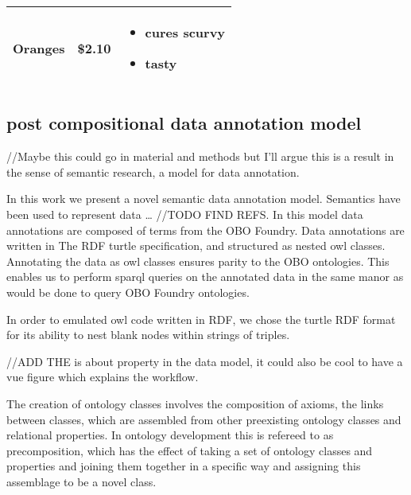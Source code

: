 \documentclass[]{article}
\providecommand{\tightlist}{%
  \setlength{\itemsep}{0pt}\setlength{\parskip}{0pt}}
\begin{document}
\begin{longtable}[]{@{}lll@{}}
\begin{minipage}[t]{0.32\columnwidth}\raggedright
Oranges\strut
\end{minipage} & \begin{minipage}[t]{0.32\columnwidth}\raggedright
\$2.10\strut
\end{minipage} & \begin{minipage}[t]{0.32\columnwidth}\raggedright
\begin{itemize}
\tightlist
\item
  cures scurvy
\item
  tasty
\end{itemize}\strut
\end{minipage}\tabularnewline
\bottomrule
\end{longtable}

\hypertarget{post-compositional-data-annotation-model}{%
\subsection{post compositional data annotation
model}\label{post-compositional-data-annotation-model}}

//Maybe this could go in material and methods but I'll argue this is a
result in the sense of semantic research, a model for data annotation.

In this work we present a novel semantic data annotation model.
Semantics have been used to represent data \ldots{} //TODO FIND REFS. In
this model data annotations are composed of terms from the OBO Foundry.
Data annotations are written in The RDF turtle specification, and
structured as nested owl classes. Annotating the data as owl classes
ensures parity to the OBO ontologies. This enables us to perform sparql
queries on the annotated data in the same manor as would be done to
query OBO Foundry ontologies.

In order to emulated owl code written in RDF, we chose the turtle RDF
format for its ability to nest blank nodes within strings of triples.

//ADD THE is about property in the data model, it could also be cool to
have a vue figure which explains the workflow.

The creation of ontology classes involves the composition of axioms, the
links between classes, which are assembled from other preexisting
ontology classes and relational properties. In ontology development this
is refereed to as precomposition, which has the effect of taking a set
of ontology classes and properties and joining them together in a
specific way and assigning this assemblage to be a novel class.
\end{document}
